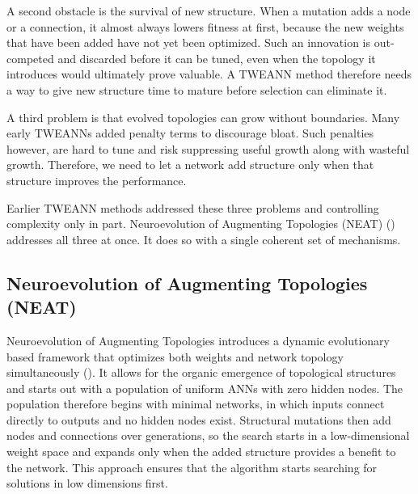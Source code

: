 \documentclass[12pt]{article}
\begin{document}
A second obstacle is the survival of new structure.
When a mutation adds a node or a connection, it almost always lowers fitness at first, because the new weights that have been added have not yet been optimized.
Such an innovation is out-competed and discarded before it can be tuned, even when the topology it introduces would ultimately prove valuable.
A TWEANN method therefore needs a way to give new structure time to mature before selection can eliminate it.

A third problem is that evolved topologies can grow without boundaries.
Many early TWEANNs added penalty terms to discourage bloat.
Such penalties however, are hard to tune and risk suppressing useful growth along with wasteful growth.
Therefore, we need to let a network add structure only when that structure improves the performance.

Earlier TWEANN methods addressed these three problems and controlling complexity only in part.
Neuroevolution of Augmenting Topologies (NEAT) (\cite{stanley_evolving_2002}) addresses all three at once.
It does so with a single coherent set of mechanisms.


\subsection{Neuroevolution of Augmenting Topologies (NEAT)}
\label{subsec:neuroevolution-of-augmenting-topologies-neat}


Neuroevolution of Augmenting Topologies introduces a dynamic evolutionary based framework that optimizes both weights and network topology simultaneously (\cite{stanley_evolving_2002}).
It allows for the organic emergence of topological structures and starts out with a population of uniform ANNs with zero hidden nodes.
The population therefore begins with minimal networks, in which inputs connect directly to outputs and no hidden nodes exist.
Structural mutations then add nodes and connections over generations, so the search starts in a low-dimensional weight space and expands only when the added structure provides a benefit to the network.
This approach ensures that the algorithm starts searching for solutions in low dimensions first.
\end{document}
